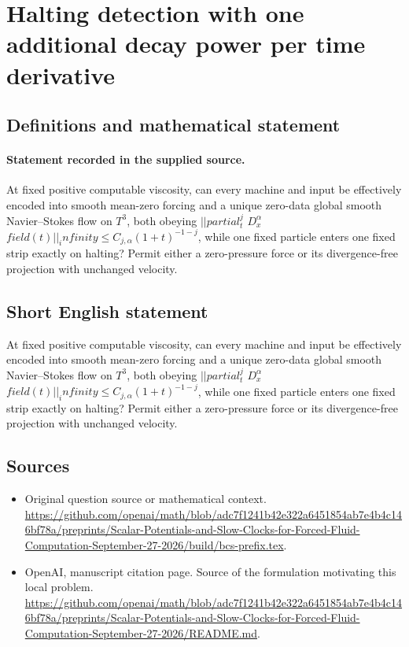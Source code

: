 \documentclass[11pt]{article}
\begin{document}
\section*{Halting detection with one additional decay power per time derivative}\label{30007320}
\subsection{Definitions and mathematical statement}
\paragraph{Statement recorded in the supplied source.}
At fixed positive computable viscosity, can every machine and input be effectively encoded into smooth mean-zero forcing and a unique zero-data global smooth Navier–Stokes flow on $T^3$, both obeying $||partial_t^j$ $D_x^\alpha $ $field(t)||_infinity\leq C_{j,\alpha }(1+t)^{-1-j}$, while one fixed particle enters one fixed strip exactly on halting? Permit either a zero-pressure force or its divergence-free projection with unchanged velocity.
\subsection{Short English statement}
At fixed positive computable viscosity, can every machine and input be effectively encoded into smooth mean-zero forcing and a unique zero-data global smooth Navier–Stokes flow on $T^3$, both obeying $||partial_t^j$ $D_x^\alpha $ $field(t)||_infinity\leq C_{j,\alpha }(1+t)^{-1-j}$, while one fixed particle enters one fixed strip exactly on halting? Permit either a zero-pressure force or its divergence-free projection with unchanged velocity.
\subsection{Sources}
\begin{itemize}
\item[S1] Original question source or mathematical context.
\url{https://github.com/openai/math/blob/adc7f1241b42e322a6451854ab7e4b4c146bf78a/preprints/Scalar-Potentials-and-Slow-Clocks-for-Forced-Fluid-Computation-September-27-2026/build/bcs-prefix.tex}.
\item[S2] OpenAI, manuscript citation page. Source of the formulation motivating this local problem.
\url{https://github.com/openai/math/blob/adc7f1241b42e322a6451854ab7e4b4c146bf78a/preprints/Scalar-Potentials-and-Slow-Clocks-for-Forced-Fluid-Computation-September-27-2026/README.md}.
\end{itemize}
\end{document}
